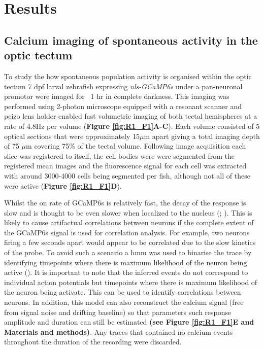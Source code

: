 \section{Results}
\subsection{Calcium imaging of spontaneous activity in the optic tectum}
To study the how spontaneous population activity is organised within the optic tectum 7 \gls{dpf} larval zebrafish expressing \textit{nls-GCaMP6s} under a pan-neuronal promotor were imaged for ~1 hr in complete darkness. This imaging was performed using 2-photon microscope equipped with a resonant scanner and peizo lens holder enabled fast volumetric imaging of both tectal hemispheres at a rate of 4.8Hz per volume (\textbf{Figure \ref{fig:R1_F1}A-C}). Each volume consisted of 5 optical sections that were approximately 15$\mu$m apart giving a total imaging depth of 75 $\mu$m covering 75\% of the tectal volume.  Following image acquisition each slice was registered to itself, the cell bodies were were segmented from the registered mean images and the fluorescence signal for each cell was extracted with around 3000-4000 cells being segmented per fish, although not all of these were active (\textbf{Figure \ref{fig:R1_F1}D}). 

Whilst the on rate of GCaMP6s is relatively fast, the decay of the response is slow and is thought to be even slower when localized to the nucleus (\cite{Chen2013}; \cite{Vladimirov2014}). This is likely to cause artifactual correlations between neurons if the complete extent of the GCaMP6s signal is used for correlation analysis. For example, two neurons firing a few seconds apart would appear to be correlated due to the slow kinetics of the probe. To avoid such a scenario a \gls{hmm} was used to binarise the trace by identifying timepoints where there is maximum likelihood of the neuron being active (\cite{Diana2019BayesianAssemblies}). It is important to note that the inferred events do not correspond to individual action potentials but timepoints where there is maximum likelihood of the neuron being activate. This can be used to identify correlations between neurons. In addition, this model can also reconstruct the calcium signal (free from signal noise and drifting baseline) so that parameters such response amplitude and duration can still be estimated \textbf{(see Figure \ref{fig:R1_F1}E and \textbf{Materials and methods})}. Any traces that contained no calcium events throughout the duration of the recording were discarded.

